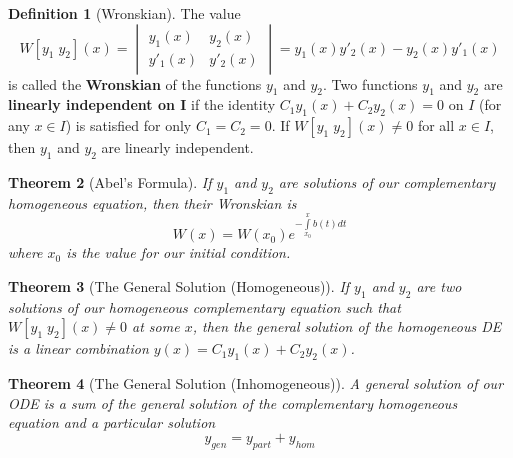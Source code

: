 \documentclass[12pt]{article}
\newtheorem{thm}{Theorem}[section]
\theoremstyle{definition}
\newtheorem{defn}[thm]{Definition}
\theoremstyle{remark}
\numberwithin{equation}{section}
\newcommand\B[1]{\textbf{ #1}}
\begin{document}
\begin{defn}[Wronskian]
        The value \begin{equation}
                W[y_1\;y_2](x) = \begin{vmatrix}y_1(x) & y_2(x) \\
                y'_1(x) & y'_2(x) \end{vmatrix} = y_1(x)y'_2(x) - y_2(x)y'_1(x) 
        \end{equation}
        is called the \B{Wronskian} of the functions $y_1$ and $y_2$. Two functions $y_1$ and $y_2$ are \B{linearly independent on I} if the identity $C_1y_1(x) + C_2y_2(x) = 0$ on $I$ (for any $x \in I$) is satisfied for only $C_1 = C_2 = 0$. If $W[y_1\;y_2](x)\neq 0$ for all $x \in I$, then $y_1$ and $y_2$ are linearly independent.
\end{defn}

\vspace{1cm}


\begin{thm}[Abel's Formula]
        If $y_1$ and $y_2$ are solutions of our complementary homogeneous equation, then their Wronskian is \begin{equation}
                W(x) = W(x_0)e^{-\int\limits_{x_0}^xb(t)dt}
        \end{equation}
        where $x_0$ is the value for our initial condition.
\end{thm}




\vspace{1cm}

\begin{thm}[The General Solution (Homogeneous)]
        If $y_1$ and $y_2$ are two solutions of our homogeneous complementary equation such that $W[y_1\;y_2](x)\neq 0$ at some $x$, then the general solution of the homogeneous DE is a linear combination $y(x) = C_1y_1(x) + C_2y_2(x)$.
\end{thm}


\vspace{1cm}


\begin{thm}[The General Solution (Inhomogeneous)]
        A general solution of our ODE is a sum of the general solution of the complementary homogeneous equation and a particular solution \begin{equation}
                y_{gen} = y_{part} + y_{hom}
        \end{equation}
\end{thm}
\end{document}
